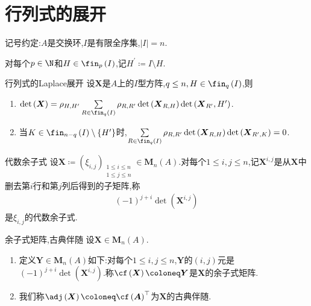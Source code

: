 \section{行列式的展开}

记号约定:$A$是交换环,$I$是有限全序集,$\left|I\right|=n$.

\begin{definition}{}{}
	对每个$p\in\N$和$H\in\fin_{p}\left(I\right)$,记$H^{\prime}\coloneq I\setminus H$.
\end{definition}

\begin{proposition}{行列式的Laplace展开}{}
	设$\boldsymbol{X}$是$A$上的$I$型方阵,$q\leq n,H\in\fin_{q}\left(I\right)$,则
	\begin{enumerate}
		\item $\det\left(\boldsymbol{X}\right)=\rho_{H,H^{\prime}}\sum\limits_{R\in\fin_{q}\left(I\right)}\rho_{R,R^{\prime}}\det\left(\boldsymbol{X}_{R,H}\right)\det\left(\boldsymbol{X}_{R^{\prime}},H^{\prime}\right)$.
		\item 当$K\in\fin_{n-q}\left(I\right)\setminus\left\{H^{\prime}\right\}$时,$\sum\limits_{R\in\fin_{q}\left(I\right)}\rho_{R,R^{\prime}}\det\left(\boldsymbol{X}_{R,H}\right)\det\left(\boldsymbol{X}_{R^{\prime},K}\right)=0$.
	\end{enumerate}
\end{proposition}

\begin{definition}{代数余子式}{}
	设$\boldsymbol{X}\coloneq\left(\xi_{i,j}\right)_{\substack{1\leq i\leq n\\1\leq j\leq n}}\in\mathbf{M}_{n}\left(A\right)$.对每个$1\leq i,j\leq n$,记$\boldsymbol{X}^{i,j}$是从$\boldsymbol{X}$中删去第$i$行和第$j$列后得到的子矩阵,称
	\begin{align*}
		\left(-1\right)^{j+i}\det\left(\boldsymbol{X}^{i,j}\right)
	\end{align*}
	是$\xi_{i,j}$的代数余子式.
\end{definition}

\begin{definition}{余子式矩阵,古典伴随}{}
	设$\boldsymbol{X}\in\mathbf{M}_{n}\left(A\right)$.
	\begin{enumerate}
		\item 定义$\boldsymbol{Y}\in\mathbf{M}_{n}\left(A\right)$如下:对每个$1\leq i,j\leq n$,$\boldsymbol{Y}$的$\left(i,j\right)$元是$\left(-1\right)^{j+i}\det\left(\boldsymbol{X}^{i,j}\right)$.称$\cf\left(\boldsymbol{X}\right)\coloneq\boldsymbol{Y}$是$\boldsymbol{X}$的余子式矩阵.
		\item 我们称$\adj\left(\boldsymbol{X}\right)\coloneq\cf\left(\boldsymbol{A}\right)^{\top}$为$\boldsymbol{X}$的古典伴随.
	\end{enumerate}
\end{definition}

